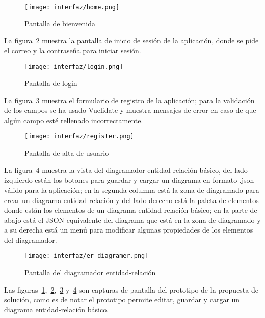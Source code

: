 \begin{figure}[H]
    \centering
    \texttt{[image: interfaz/home.png]}
    \caption{Pantalla de bienvenida}
    \label{img:prototipo-welcome}
\end{figure}

La figura~\ref{img:prototipo-login} muestra la pantalla de inicio de sesión de la aplicación, donde se pide el correo y la contraseña para iniciar sesión.


\begin{figure}[H]
    \centering
    \texttt{[image: interfaz/login.png]}
    \caption{Pantalla de login}
    \label{img:prototipo-login}
\end{figure}
La figura~\ref{img:prototipo-signup} muestra el formulario de registro de la aplicación; para la validación de los campos se ha usado Vuelidate y muestra mensajes de error en caso de que algún campo esté rellenado incorrectamente.


\begin{figure}[H]
    \centering
    \texttt{[image: interfaz/register.png]}
    \caption{Pantalla de alta de usuario}
    \label{img:prototipo-signup}
\end{figure}
La figura~\ref{img:prototipo-er} muestra la vista del diagramador entidad-relación básico, del lado izquierdo están los botones para guardar y cargar un diagrama en formato .json válido para la aplicación; en la segunda columna está la zona de diagramado para crear un diagrama entidad-relación y del lado derecho está la paleta de elementos donde están los elementos de un diagrama entidad-relación básico; en la parte de abajo está el JSON equivalente del diagrama que está en la zona de diagramado y a su derecha está un menú para modificar algunas propiedades de los elementos del diagramador.

\begin{figure}[H]
    \centering
    \texttt{[image: interfaz/er\_diagramer.png]}
    \caption{Pantalla del diagramador entidad-relación}
    \label{img:prototipo-er}
\end{figure}



Las figuras~\ref{img:prototipo-welcome},~\ref{img:prototipo-login},~\ref{img:prototipo-signup} y~\ref{img:prototipo-er} son capturas de pantalla del prototipo de la propuesta de solución, como es de notar el prototipo permite editar, guardar y cargar un diagrama entidad-relación básico.

